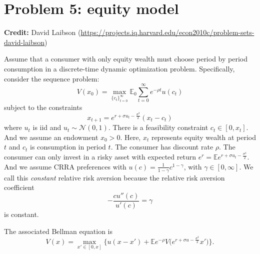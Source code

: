 \documentclass[11pt]{extarticle}
\theoremstyle{plain}
\theoremstyle{definition}
\begin{document}
\section*{Problem 5: equity model}

\textbf{Credit:} David Laibson (\url{https://projects.iq.harvard.edu/econ2010c/problem-sets-david-laibson})

\vspace{5mm}
\noindent
Assume that a consumer with only equity wealth must choose period by period consumption in a discrete-time dynamic optimization problem. Specifically, consider the sequence problem:
\begin{equation*}
	V(x_0) = \max_{ \{ c_t \}_{t=0}^\infty } \mathbb E_0 \sum_{t=0}^\infty e^{- \rho t} u(c_t)
\end{equation*}
subject to the constraints
\begin{equation*}
	x_{t+1} = e^{r + \sigma u_t - \frac{\sigma^2}{2}} (x_t - c_t)
\end{equation*}
where $u_t$ is iid and $u_t \sim \mathcal N(0, 1)$. There is a feasibility constraint $c_t \in [0, x_t]$. And we assume an endowment $x_0 > 0$. Here, $x_t$ represents equity wealth at period $t$ and $c_t$ is consumption in period $t$. The consumer has discount rate $\rho$. The consumer can only invest in a risky asset with expected return $e^r = \mathbb E e^{r + \sigma u_t - \frac{\sigma^2}{2}}$. And we assume CRRA preferences with $u(c) = \frac{1}{1-\gamma} c^{1-\gamma}$, with $\gamma \in [0, \infty]$. We call this \textit{constant} relative risk aversion because the relative risk aversion coefficient
\begin{equation*}
	- \frac{c u''(c)}{u'(c)} = \gamma
\end{equation*}
is constant. 

The associated Bellman equation is 
\begin{equation*}
	V(x) = \max_{x' \in [0, x]} \bigg\{ u(x - x') + \mathbb E e^{- \rho} V \bigg( e^{r + \sigma u - \frac{\sigma^2}{2}} x' \bigg) \bigg\}.
\end{equation*}
\end{document}
